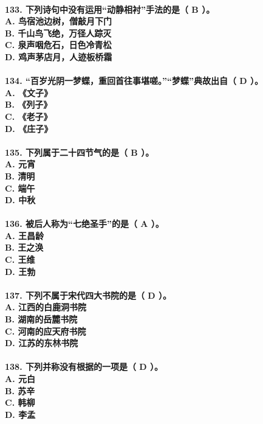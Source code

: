 \documentclass[UTF8]{ctexart} %
\begin{document}
\paragraph{
133. 下列诗句中没有运用“动静相衬”手法的是（ \color{red}B\color{black} ）。 \\
    A. 鸟宿池边树，僧敲月下门 \\
    B. 千山鸟飞绝，万径人踪灭 \\
    C. 泉声咽危石，日色冷青松 \\
    D. 鸡声茅店月，人迹板桥霜
}
\paragraph{
134. “百岁光阴一梦蝶，重回首往事堪嗟。”“梦蝶”典故出自（ \color{red}D\color{black} ）。 \\
    A. 《文子》 \\
    B. 《列子》 \\
    C. 《老子》 \\
    D. 《庄子》
}
\paragraph{
135. 下列属于二十四节气的是（ \color{red}B\color{black} ）。 \\
    A. 元宵 \\
    B. 清明 \\
    C. 端午 \\
    D. 中秋
}
\paragraph{
136. 被后人称为“七绝圣手”的是（ \color{red}A\color{black} ）。 \\
    A. 王昌龄 \\
    B. 王之涣 \\
    C. 王维 \\
    D. 王勃
}
\paragraph{
137. 下列不属于宋代四大书院的是（ \color{red}D\color{black} ）。 \\
    A. 江西的白鹿洞书院 \\
    B. 湖南的岳麓书院 \\
    C. 河南的应天府书院 \\
    D. 江苏的东林书院
}
\paragraph{
138. 下列并称没有根据的一项是（ \color{red}D\color{black} ）。 \\
    A. 元白 \\
    B. 苏辛 \\
    C. 韩柳 \\
    D. 李孟
}
\end{document}

